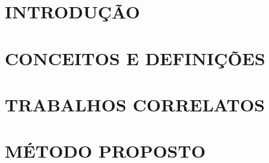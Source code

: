 \documentclass[
	12pt,				%
  oneside,
	a4paper,			%
	chapter=TITLE,		%
	english,			%
	brazil				%
	]{abntex2}
\begin{document}

\renewcommand{\contentsname}{Sumário}
\tableofcontents*
\cleardoublepage



\textual
\chapter{INTRODUÇÃO}


\chapter{CONCEITOS E DEFINIÇÕES}


\chapter{TRABALHOS CORRELATOS}


\chapter{MÉTODO PROPOSTO}



% 
%
\end{document}
